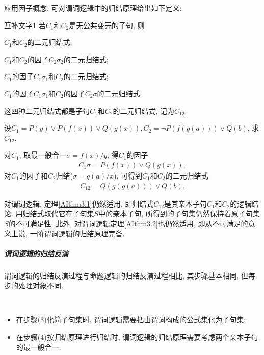 应用因子概念, 可对谓词逻辑中的归结原理给出如下定义:
\begin{mydef}{互补文字}{1}
若$C_1$和$C_2$是无公共变元的子句, 则

\quad   {} $C_1$和$C_2$的二元归结式;

\quad   {}  $C_1$和$C_2$的因子$C_2 \sigma_2$的二元归结式;

\quad   {}  $C_1$的因子$C_1\sigma_1$和$C_2$的二元归结式;

\quad   {} $C_1$的因子$C_1\sigma_1$和$C_2$的因子$C_2 \sigma$的二元归结式.

这四种二元归结式都是子句$C_1$和$C_2$的二元归结式, 记为$C_{12}$.
\end{mydef}
\begin{example}
  设$C_1=P(y)\vee P(f(x))\vee Q(g(x)), C_2 =\neg P(f(g(a)))\vee Q(b)$, 求$C_{12}$.
\end{example}
\begin{result}
对$C_1$, 取最一般合一$\sigma ={f(x)/y}$, 得$C_1$的因子
\begin{align}
  C_1\sigma =P(f(x))\vee Q(g(x)),
\end{align}
对$C_1$的因子和$C_2$归结($\sigma={g(a)/x }$), 可得到$C_1$和$C_2$的二元归结式
\begin{align}
  C_{12}=Q(g(g(a)))\vee Q(b).
\end{align}
\end{result}
\begin{remark}
对谓词逻辑, 定理\ref{AIthm3.1}仍然适用, 即归结式$C_{12}$是其亲本子句$C_1$和$C_2$的逻辑结论. 用归结式取代它在子句集$S$中的亲本子句, 所得到的子句集仍然保持着原子句集$S$的不可满足性.
此外, 对谓词逻辑定理\ref{AIthm3.2}也仍然适用, 即从不可满足的意义上说, 一阶谓词逻辑的归结原理完备.
\end{remark}
\subparagraph{谓词逻辑的归结反演}
谓词逻辑的归结反演过程与命题逻辑的归结反演过程相比, 其步骤基本相同, 但每步的处理对象不同.
\begin{example}~{}
	
\begin{itemize}
\item 在步骤(3)化简子句集时, 谓词逻辑需要把由谓词构成的公式集化为子句集;
\item 在步骤(4)按归结原理进行归结时, 谓词逻辑的归结原理需要考虑两个亲本子句的最一般合一.
\end{itemize}
\end{example}
